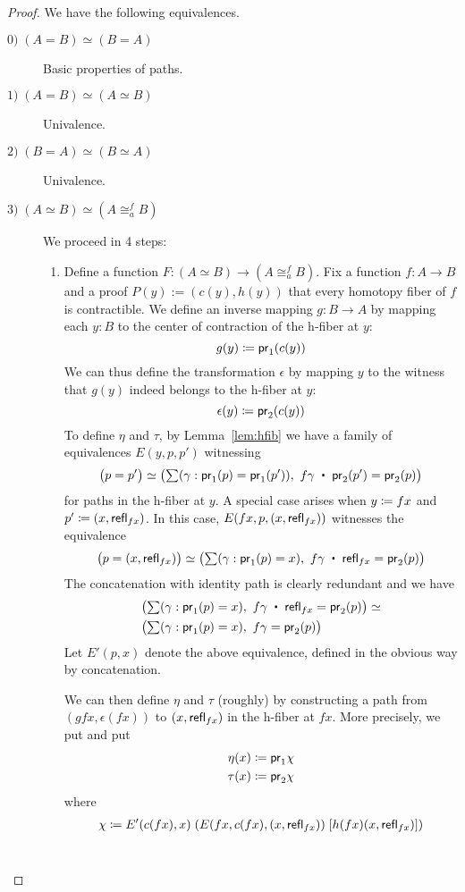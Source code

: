 \begin{proof}
We have the following equivalences.
\begin{description}
\item [$\mathit{0)} \; (A = B) \simeq (B = A)$]
Basic properties of paths.

\item[$\mathit{1)} \; (A = B) \simeq (A \simeq B)$]
Univalence.

\item[$\mathit{2)} \; (B = A) \simeq (B \simeq A)$]
Univalence.

\item[$\mathit{3)} \; (A \simeq B) \simeq (A \cong^f_a B)$] We proceed in 4 steps:
\begin{enumerate}
\item Define a function $F : (A \simeq B) \to (A \cong^f_a B)$. Fix a function $f : A \to B$ and a proof $P(y) := (c(y), h(y))$ that every homotopy fiber of $f$ is contractible.
We define an inverse mapping $g : B \to A$ by mapping each $y : B$ to the center of contraction of the h-fiber at $y$:
\[ g(y) \coloneqq \mathsf{pr}_{1}(c(y)) \]
We can thus define the transformation $\epsilon$ by mapping $y$ to the witness that $g(y)$ indeed belongs to the h-fiber at $y$:
\[ \epsilon(y) \coloneqq \mathsf{pr}_{2}(c(y)) \]
To define $\eta$ and $\tau$, by Lemma~\ref{lem:hfib} we have a family of equivalences $E(y,p,p')$ witnessing
\[ \big( p = p' \big) \simeq \big( \sm{\gamma : \proj{1}(p) = \proj{1}(p')} f\gamma \; \ct \; \proj{2}(p') = \proj{2}(p) \big) \]
for paths in the h-fiber at $y$. A special case arises when $y \coloneqq fx$ and $p' \coloneqq (x,\mathsf{refl}_{fx})$. In this case,
$E(fx,p,(x,\mathsf{refl}_{fx}))$ witnesses the equivalence
\[ \big( p = (x,\refl{fx}) \big) \simeq \big( \sm{\gamma : \proj{1}(p) = x} f\gamma \; \ct \; \refl{fx} = \proj{2}(p) \big) \]
The concatenation with identity path is clearly redundant and we have
\begin{align*}
& \big( \sm{\gamma : \proj{1}(p) = x} f\gamma \; \ct \; \refl{fx} = \proj{2}(p) \big) \simeq \\ 
& \big( \sm{\gamma : \proj{1}(p) = x} f\gamma = \proj{2}(p) \big)
\end{align*}
Let $E'(p,x)$ denote the above equivalence, defined in the obvious way by concatenation.
\medskip

We can then define $\eta$ and $\tau$ (roughly) by constructing a path from $(gfx,\epsilon(fx))$ to $(x,\mathsf{refl}_{fx})$ in the h-fiber at $fx$. More precisely, we put
and put
\begin{align*}
\eta(x) & \coloneqq \mathsf{pr}_{1} \chi \\
\tau(x) & \coloneqq \mathsf{pr}_{2} \chi
\end{align*}
where
\begin{align*} \chi \coloneqq E'(c(fx), x) \; (E(fx, c(fx), (x,\mathsf{refl}_{fx})) \; [h(fx)(x, \mathsf{refl}_{fx})]) \end{align*} \\



\end{enumerate}
\end{description}
\end{proof}
